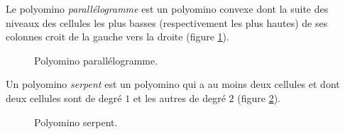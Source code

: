   
 Le polyomino \emph{parallélogramme}  est un polyomino convexe dont la suite des niveaux des  cellules les plus basses (respectivement les plus hautes) de ses colonnes croit de la gauche vers la droite (figure \ref{fig8}).
\begin{figure}[!htb]
\begin{minipage}[c]{.25\linewidth}
        \centering

\end{minipage}
\hfill
\begin{minipage}[c]{.63\linewidth}
        \centering
\begin{logicpuzzle}[rows=8,columns=5,color=cyan!100, width=750px,scale=0.5]
\framepuzzle[black!50]
\end{logicpuzzle}
\end{minipage}
\hfill
\caption{\label{fig8} Polyomino parallélogramme.}
\end{figure}

Un polyomino \emph{serpent} est un polyomino qui a au moins deux cellules et dont   deux cellules sont de degré $1$ et les autres de degré $2$ (figure \ref{serp1}).
\begin{figure}[!htb]
\begin{minipage}[c]{.03\linewidth}
   \centering 
\end{minipage}
\hfill
\begin{minipage}[c]{.66\linewidth}
   \centering
\begin{logicpuzzle}[rows=6,columns=7,color=cyan!100, width=750px,scale=0.5]
\framepuzzle[black!50]
\end{logicpuzzle}
\end{minipage}
\caption{\label{serp1} Polyomino serpent.}
\end{figure}

